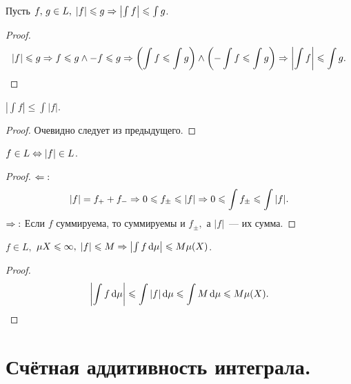 \documentclass{notes}
\begin{document}
	\begin{pr}
		Пусть $f, \, g \in L, \; |f| \leqslant g \Rightarrow \left|\int f \right| \leqslant \int g$. 
		\begin{proof}
			\[
				|f| \leqslant g \Rightarrow f \leqslant g \wedge -f \leqslant g \Rightarrow \left(\int f \leqslant \int g \right) \wedge \left(-\int f \leqslant \int g\right) \Rightarrow \left| \int f \right| \leqslant \int g.
			\]
		\end{proof}
	\end{pr}

	\begin{pr}
		$\left|\int f\right| \leqslant \int |f|$.
		\begin{proof}
			Очевидно следует из предыдущего.
		\end{proof}
	\end{pr}

	\begin{pr}
		$f \in L \Leftrightarrow |f| \in L$.
		\begin{proof}
			$\Leftarrow\text{\text{:}}$ 
			\[
				|f| = f_{+} + f_{-} \Rightarrow 0 \leqslant f_{\pm} \leqslant |f| \Rightarrow 0 \leqslant \int f_{\pm} \leqslant \int |f|.
			\] 
			$\Rightarrow\text{\text{:}}$ Если $f$ суммируема, то суммируемы и $f_{\pm},$ а $|f|$~--- их сумма.
		\end{proof}
	\end{pr}

	\begin{pr}
		$f \in L,$ $\mu X \leqslant \infty, \; |f|\leqslant M \Rightarrow \left|\int f \, \mathrm{d} \mu\right| \leqslant M \mu(X)$.
		\begin{proof}
			\[
				\left|\int f \, \mathrm{d} \mu\right| \leqslant \int |f| \, \mathrm{d} \mu \leqslant \int M \, \mathrm{d} \mu \leqslant M \mu(X). 
			\]
		\end{proof}
	\end{pr}

\section{Счётная аддитивность интеграла.}
\end{document}
